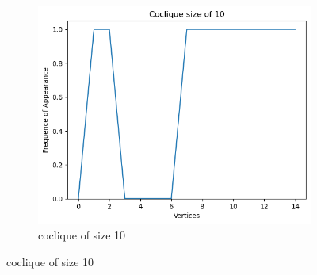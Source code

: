 \documentclass{amsart}
\theoremstyle{definition}
\begin{document}
\begin{appendix}
\begin{figure}[hbt!]
\begin{subfigure}[b]{.45\textwidth}
			\includegraphics[width=1\linewidth]{depth_4_size_10.png}
			\caption{coclique of size 10}
		\end{subfigure}
	\end{figure}


\end{appendix}
\end{document}
